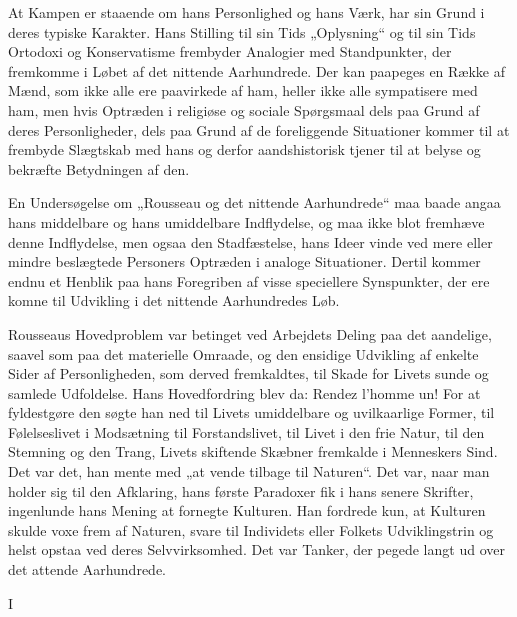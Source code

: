 \documentclass[12pt,a4paper,openany]{book}
\newcommand{\opage}[1]{\marginnote{\footnotesize\textit{[#1]}}}
\begin{document}
At Kampen er staaende om hans Personlighed og hans
Værk, har sin Grund i deres typiske Karakter. Hans Stilling
til sin Tids „Oplysning“ og til sin Tids Ortodoxi og Konservatisme
frembyder Analogier med Standpunkter, der fremkomme
i Løbet af det nittende Aarhundrede. Der kan paapeges en
Række af Mænd, som ikke alle ere paavirkede af ham, heller
ikke alle sympatisere med ham, men hvis Optræden i religiøse
og sociale Spørgsmaal dels paa Grund af deres Personligheder,
dels paa Grund af de foreliggende Situationer kommer til at
frembyde Slægtskab med hans og derfor aandshistorisk tjener
til at belyse og bekræfte Betydningen af den.

En Undersøgelse om „Rousseau og det nittende Aarhundrede“
maa baade angaa hans middelbare og hans umiddelbare Indflydelse,
og maa ikke blot fremhæve denne Indflydelse, men
ogsaa den Stadfæstelse, hans Ideer vinde ved mere eller mindre
beslægtede Personers Optræden i analoge Situationer. Dertil
kommer endnu et Henblik paa hans Foregriben af visse speciellere
Synspunkter, der ere komne til Udvikling i det nittende
Aarhundredes Løb.

Rousseaus Hovedproblem var betinget ved Arbejdets Deling
paa det aandelige, saavel som paa det materielle Omraade, og
den ensidige Udvikling af enkelte Sider af Personligheden, som
derved fremkaldtes, til Skade for Livets sunde og samlede Udfoldelse.
Hans Hovedfordring blev da: Rendez l’homme un! For
at fyldestgøre den søgte han ned til Livets umiddelbare og uvilkaarlige
Former, til Følelseslivet i Modsætning til Forstandslivet,
til Livet i den frie Natur, til den Stemning og den Trang, Livets
skiftende Skæbner fremkalde i Menneskers Sind. Det var
det, han mente med „at vende tilbage til Naturen“. Det var,
naar man holder sig til den Afklaring, hans første Paradoxer
fik i hans senere Skrifter, ingenlunde hans Mening at fornegte
Kulturen. Han fordrede kun, at Kulturen skulde voxe frem af
Naturen, svare til Individets eller Folkets Udviklingstrin og helst
opstaa ved deres Selvvirksomhed. Det var Tanker, der pegede
langt ud over det attende Aarhundrede.

\setcounter{footnote}{0}%
\opage{122}\begin{center}I\end{center}
\end{document}
